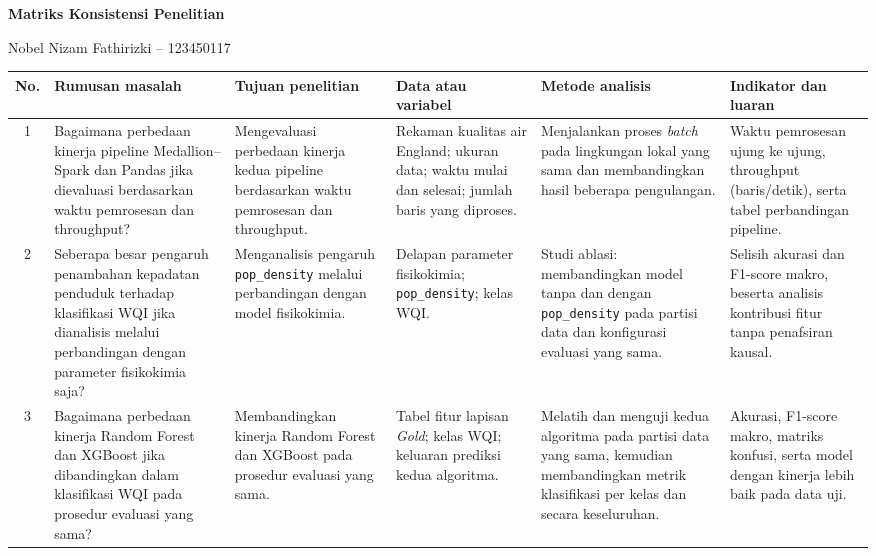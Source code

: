 \documentclass[12pt,a4paper]{article}
\begin{document}
\begin{center}
    {\Large\bfseries Matriks Konsistensi Penelitian}\par
    \vspace{4pt}
    Nobel Nizam Fathirizki -- 123450117
\end{center}

\vspace{8pt}

\begin{table}[h]
    \centering
    \scriptsize
    \setlength{\tabcolsep}{3pt}
    \renewcommand{\arraystretch}{1.25}
    \begin{tabularx}{\linewidth}{|c|>{\raggedright\arraybackslash}X|>{\raggedright\arraybackslash}X|>{\raggedright\arraybackslash}X|>{\raggedright\arraybackslash}X|>{\raggedright\arraybackslash}X|}
        \hline
        \textbf{No.} & \textbf{Rumusan masalah} & \textbf{Tujuan penelitian} & \textbf{Data atau variabel} & \textbf{Metode analisis} & \textbf{Indikator dan luaran} \\
        \hline
        1 & Bagaimana perbedaan kinerja pipeline Medallion--Spark dan Pandas jika dievaluasi berdasarkan waktu pemrosesan dan throughput? & Mengevaluasi perbedaan kinerja kedua pipeline berdasarkan waktu pemrosesan dan throughput. & Rekaman kualitas air England; ukuran data; waktu mulai dan selesai; jumlah baris yang diproses. & Menjalankan proses \textit{batch} pada lingkungan lokal yang sama dan membandingkan hasil beberapa pengulangan. & Waktu pemrosesan ujung ke ujung, throughput (baris/detik), serta tabel perbandingan pipeline. \\
        \hline
        2 & Seberapa besar pengaruh penambahan kepadatan penduduk terhadap klasifikasi WQI jika dianalisis melalui perbandingan dengan parameter fisikokimia saja? & Menganalisis pengaruh \texttt{pop\_density} melalui perbandingan dengan model fisikokimia. & Delapan parameter fisikokimia; \texttt{pop\_density}; kelas WQI. & Studi ablasi: membandingkan model tanpa dan dengan \texttt{pop\_density} pada partisi data dan konfigurasi evaluasi yang sama. & Selisih akurasi dan F1-score makro, beserta analisis kontribusi fitur tanpa penafsiran kausal. \\
        \hline
        3 & Bagaimana perbedaan kinerja Random Forest dan XGBoost jika dibandingkan dalam klasifikasi WQI pada prosedur evaluasi yang sama? & Membandingkan kinerja Random Forest dan XGBoost pada prosedur evaluasi yang sama. & Tabel fitur lapisan \textit{Gold}; kelas WQI; keluaran prediksi kedua algoritma. & Melatih dan menguji kedua algoritma pada partisi data yang sama, kemudian membandingkan metrik klasifikasi per kelas dan secara keseluruhan. & Akurasi, F1-score makro, matriks konfusi, serta model dengan kinerja lebih baik pada data uji. \\
        \hline
    \end{tabularx}
\end{table}
\end{document}
